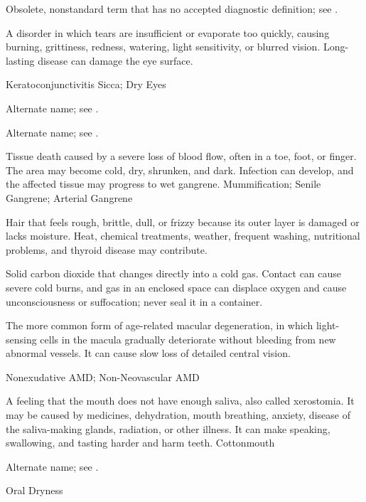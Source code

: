  Obsolete, nonstandard term that has no accepted diagnostic definition; see .

 A disorder in which tears are insufficient or evaporate too quickly, causing burning, grittiness, redness, watering, light sensitivity, or blurred vision. Long-lasting disease can damage the eye surface.

\synonyms
Keratoconjunctivitis Sicca; Dry Eyes

 Alternate name; see .

 Alternate name; see .

 Tissue death caused by a severe loss of blood flow, often in a toe, foot, or finger. The area may become cold, dry, shrunken, and dark. Infection can develop, and the affected tissue may progress to wet gangrene.
\synonyms
Mummification; Senile Gangrene; Arterial Gangrene


 Hair that feels rough, brittle, dull, or frizzy because its outer layer is damaged or lacks moisture. Heat, chemical treatments, weather, frequent washing, nutritional problems, and thyroid disease may contribute.

 Solid carbon dioxide that changes directly into a cold gas. Contact can cause severe cold burns, and gas in an enclosed space can displace oxygen and cause unconsciousness or suffocation; never seal it in a container.

 The more common form of age-related macular degeneration, in which light-sensing cells in the macula gradually deteriorate without bleeding from new abnormal vessels. It can cause slow loss of detailed central vision.

\synonyms
Nonexudative AMD; Non-Neovascular AMD

 A feeling that the mouth does not have enough saliva, also called xerostomia. It may be caused by medicines, dehydration, mouth breathing, anxiety, disease of the saliva-making glands, radiation, or other illness. It can make speaking, swallowing, and tasting harder and harm teeth.
\synonyms
Cottonmouth

 Alternate name; see .

\synonyms
Oral Dryness

